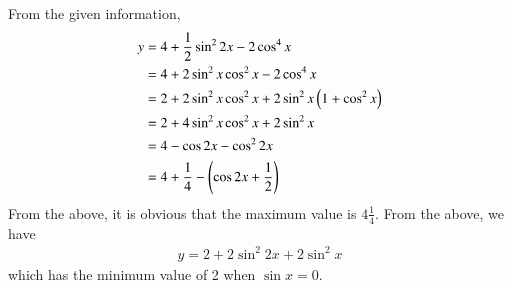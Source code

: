 From the given information,
%
\begin{align}
y &= 4 + \frac{1}{2}\sin^2 2x -2 \cos ^4 x \\
&= 4 + 2\sin^2 x \cos^2 x - 2 \cos ^4 x \\
&= 2 + 2\sin^2 x \cos^2 x + 2 \sin^2 x\left(1+\cos ^2 x\right) \\
&= 2 + 4\sin^2 x \cos^2 x + 2 \sin^2 x \\
&= 4 - \cos 2 x - \cos^2 2x\\
& = 4 + \frac{1}{4}-\left(\cos 2x + \frac{1}{2}\right) 
\end{align}
%
From the above, it is obvious that the maximum value is $4 \frac{1}{4}$.  From the above, we have
%
\begin{align}
y = 2 + 2\sin^2 2x + 2 \sin^2 x 
\end{align}
%
which has the  minimum value of 2 when $\sin x = 0$.
